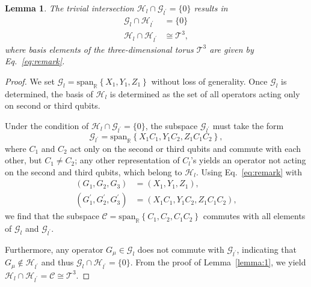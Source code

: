 \documentclass[aps,showpacs,amsmath,amssymb,twocolumn,prx,longbibliography,superscriptaddress,notitlepage,floatfix,10pt]{revtex4-2}
\newtheorem{lemma}{Lemma} %
\begin{document}
\begin{lemma}
The trivial intersection $\mathcal{H}_{l}\cap\mathcal{G}_{l^{\prime}}=\{0\}$ results in 
\begin{equation}
\begin{split}
    \mathcal{G}_{l}\cap\mathcal{H}_{l^{\prime}}&=\{0\}\\
        \mathcal{H}_{l}\cap\mathcal{H}_{l^{\prime}}&\cong \mathcal{T}^{3},
\end{split}
\end{equation}
where basis elements of the three-dimensional torus $\mathcal{T}^{3}$ are given by Eq.~\eqref{eq:remark}.
\label{lemma:3}
\end{lemma}
\begin{proof}
    We set $\mathcal{G}_{l}=\mathrm{span}_{\mathbb{R}}\left\{X_{1},Y_{1},Z_{1}\right\}$ without loss of generality. Once $\mathcal{G}_{l}$ is determined, the basis of $\mathcal{H}_{l}$ is determined as the set of all operators acting only on second or third qubits.

    Under the condition of $\mathcal{H}_{l}\cap\mathcal{G}_{l^{\prime}}=\{0\}$, the subspace $\mathcal{G}_{l^{\prime}}$ must take the form
    \begin{equation}
        \mathcal{G}_{l^{\prime}}=\mathrm{span}_{\mathbb{R}}\left\{X_{1} C_{1},Y_{1} C_{2},Z_{1} C_{1}C_{2}\right\},
    \end{equation}
    where $C_{1}$ and $C_{2}$ act only on the second or third qubits and commute with each other, but $C_{1}\not=C_{2}$; any other representation of $C_{l}$'s yields an operator not acting on the second and third qubits, which belong to $\mathcal{H}_{l}$. Using Eq.~\eqref{eq:remark} with
    \begin{equation}
    \begin{split}
        (G_{1},G_{2},G_{3})&=(X_{1},Y_{1},Z_{1}),\\
        (G_{1}^{\prime},G_{2}^{\prime},G_{3}^{\prime})&=(X_{1}C_{1},Y_{1}C_{2},Z_{1}C_{1}C_{2}),
    \end{split}
    \end{equation}
    we find that the subspace $\mathcal{C}=\mathrm{span}_{\mathbb{R}}\left\{C_{1},C_{2},C_{1}C_{2}\right\}$ commutes with all elements of $\mathcal{G}_{l}$ and $\mathcal{G}_{l^{\prime}}$. 
    
        Furthermore, any operator $G_\mu\in\mathcal{G}_{l}$ does not commute with $\mathcal{G}_{l^{\prime}}$, indicating that $G_\mu\not\in\mathcal{H}_{l^{\prime}}$ and thus $\mathcal{G}_{l}\cap\mathcal{H}_{l^{\prime}}=\{0\}$. From the proof of Lemma~\ref{lemma:1}, we yield $\mathcal{H}_{l}\cap\mathcal{H}_{l^{\prime}}=\mathcal{C}\cong\mathcal{T}^3$.
\end{proof}
\end{document}
